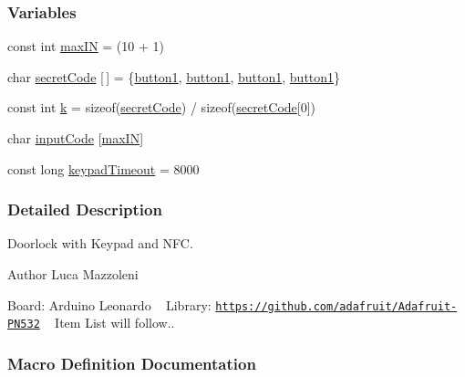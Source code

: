 \subsubsection*{Variables}
\begin{DoxyCompactItemize}
\item 
const int \hyperlink{TuerschlossNFC_8ino_a19fc6d5167836668952e3419f7f4d88a}{max\+IN} = (10 + 1)
\item 
char \hyperlink{TuerschlossNFC_8ino_a13219271ff45946b1226a309506f2d01}{secret\+Code} \mbox{[}$\,$\mbox{]} = \{\hyperlink{TuerschlossNFC_8ino_a4f09c26739530bc1c83dc50f141d98d5}{button1}, \hyperlink{TuerschlossNFC_8ino_a4f09c26739530bc1c83dc50f141d98d5}{button1}, \hyperlink{TuerschlossNFC_8ino_a4f09c26739530bc1c83dc50f141d98d5}{button1}, \hyperlink{TuerschlossNFC_8ino_a4f09c26739530bc1c83dc50f141d98d5}{button1}\}
\item 
const int \hyperlink{TuerschlossNFC_8ino_aeac95f79b72f13ef3244522682ba9a21}{k} = sizeof(\hyperlink{TuerschlossNFC_8ino_a13219271ff45946b1226a309506f2d01}{secret\+Code}) / sizeof(\hyperlink{TuerschlossNFC_8ino_a13219271ff45946b1226a309506f2d01}{secret\+Code}\mbox{[}0\mbox{]})
\item 
char \hyperlink{TuerschlossNFC_8ino_a63f2655f6a154dede1622b1fd5fc2e36}{input\+Code} \mbox{[}\hyperlink{TuerschlossNFC_8ino_a19fc6d5167836668952e3419f7f4d88a}{max\+IN}\mbox{]}
\item 
const long \hyperlink{TuerschlossNFC_8ino_a491df98d0a1b82a8dc435d99cc94e733}{keypad\+Timeout} = 8000
\end{DoxyCompactItemize}


\subsubsection{Detailed Description}
Doorlock with Keypad and N\+FC. 

\begin{DoxyAuthor}{Author}
Luca Mazzoleni
\end{DoxyAuthor}
Board\+: Arduino Leonardo ~\newline
 Library\+: \href{https://github.com/adafruit/Adafruit-PN532}{\tt https\+://github.\+com/adafruit/\+Adafruit-\/\+P\+N532} ~\newline
 Item List will follow.. 

\subsubsection{Macro Definition Documentation}
